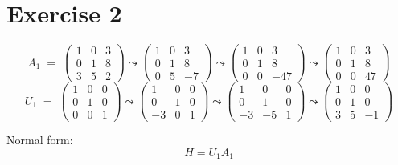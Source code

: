 \documentclass[a4paper]{scrreprt}
\begin{document}
\section*{Exercise 2}

\[A_1 \;=\; \begin{pmatrix}1 & 0 & 3 \\ 0 & 1 & 8 \\ 3 & 5 & 2\end{pmatrix}
    \leadsto\begin{pmatrix}1 & 0 & 3 \\ 0 & 1 & 8 \\ 0 & 5 & -7\end{pmatrix}
    \leadsto\begin{pmatrix}1 & 0 & 3 \\ 0 & 1 & 8 \\ 0 & 0 & -47\end{pmatrix}
    \leadsto\begin{pmatrix}1 & 0 & 3 \\ 0 & 1 & 8 \\ 0 & 0 & 47\end{pmatrix}\]
\[U_1 \;=\; \begin{pmatrix}1 & 0 & 0\\0 & 1 & 0\\0 & 0 & 1\end{pmatrix}
    \leadsto\begin{pmatrix}1 & 0 & 0\\0 & 1 & 0\\-3 & 0 & 1\end{pmatrix}
    \leadsto\begin{pmatrix}1 & 0 & 0\\0 & 1 & 0\\-3 & -5 & 1\end{pmatrix}
\leadsto\begin{pmatrix}1 & 0 & 0\\0 & 1 & 0\\3 & 5 & -1\end{pmatrix}\]

Normal form:\[H=U_1A_1\]
\end{document}
